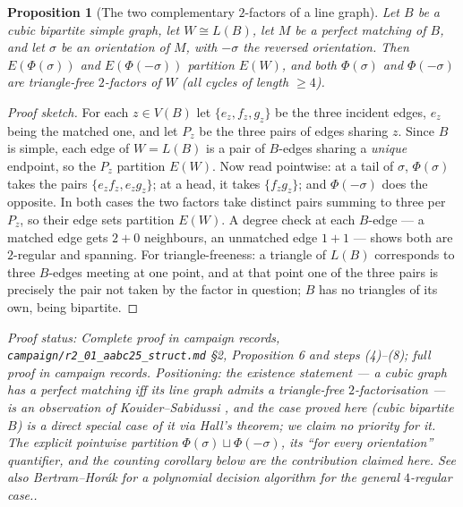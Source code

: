 \documentclass[a4paper,11pt]{amsart}
\newtheorem{proposition}[theorem]{Proposition}
\theoremstyle{definition}
\theoremstyle{remark}
\newcommand{\proofsrc}[1]{\par\smallskip\noindent\begin{sloppypar}\small\emph{Proof status: #1.}\end{sloppypar}\par\smallskip}
\begin{document}
\begin{proposition}[The two complementary $2$-factors of a line graph]\label{prop:antiphi}
Let $B$ be a cubic bipartite simple graph, let $W\cong L(B)$, let $M$ be a perfect matching of $B$, and let
$\sigma$ be an orientation of $M$, with $-\sigma$ the reversed orientation. Then $E(\Phi(\sigma))$ and
$E(\Phi(-\sigma))$ \emph{partition} $E(W)$, and both $\Phi(\sigma)$ and $\Phi(-\sigma)$ are triangle-free
$2$-factors of $W$ (all cycles of length $\ge4$).
\end{proposition}
\begin{proof}[Proof sketch]
For each $z\in V(B)$ let $\{e_z,f_z,g_z\}$ be the three incident edges, $e_z$ being the matched one, and
let $P_z$ be the three pairs of edges sharing $z$. Since $B$ is simple, each edge of $W=L(B)$ is a pair of
$B$-edges sharing a \emph{unique} endpoint, so the $P_z$ partition $E(W)$. Now read pointwise: at a tail of
$\sigma$, $\Phi(\sigma)$ takes the pairs $\{e_zf_z,e_zg_z\}$; at a head, it takes $\{f_zg_z\}$; and
$\Phi(-\sigma)$ does the opposite. In both cases the two factors take distinct pairs summing to three per
$P_z$, so their edge sets partition $E(W)$. A degree check at each $B$-edge --- a matched edge gets $2+0$
neighbours, an unmatched edge $1+1$ --- shows both are $2$-regular and spanning. For triangle-freeness: a
triangle of $L(B)$ corresponds to three $B$-edges meeting at one point, and at that point one of the three
pairs is precisely the pair not taken by the factor in question; $B$ has no triangles of its own, being
bipartite.
\end{proof}
\proofsrc{Complete proof in campaign records, \texttt{campaign/r2\_01\_aabc25\_struct.md} \S2,
Proposition 6 and steps (4)--(8); full proof in campaign records. Positioning: the \emph{existence}
statement --- a cubic graph has a perfect matching iff its line graph admits a triangle-free
$2$-factorisation --- is an observation of Kouider--Sabidussi \cite{KS95}, and the case proved here (cubic
bipartite $B$) is a direct special case of it via Hall's theorem; we claim no priority for it. The explicit
pointwise partition $\Phi(\sigma)\sqcup\Phi(-\sigma)$, its ``for every orientation'' quantifier, and the
counting corollary below are the contribution claimed here. See also Bertram--Hor\'ak \cite{BH97} for a
polynomial decision algorithm for the general $4$-regular case.}
\end{document}
